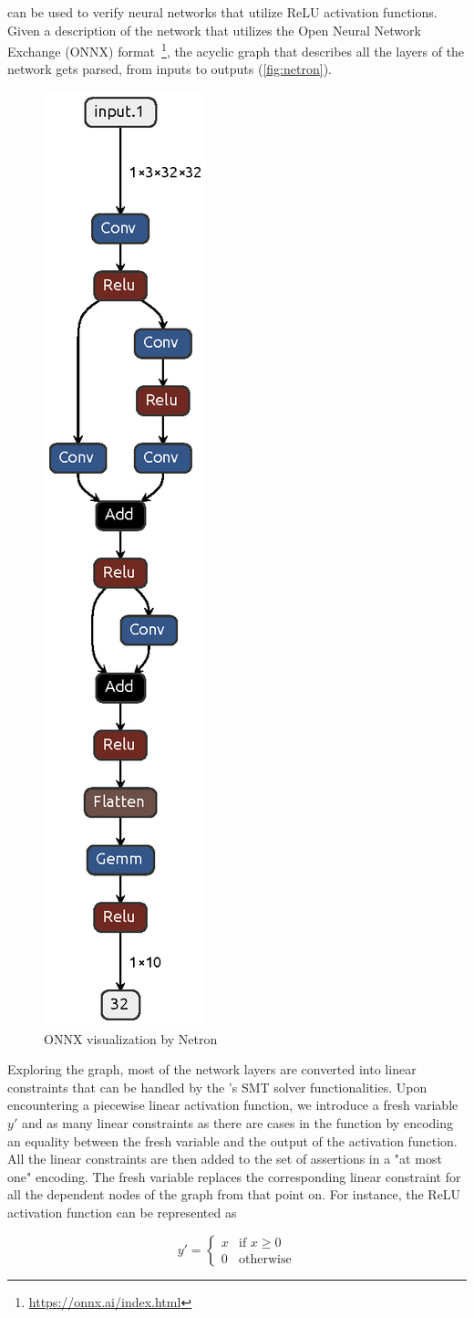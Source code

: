 \documentclass[runningheads]{llncs}
\begin{document}
\dlinear can be used to verify neural networks that utilize ReLU activation functions.
Given a description of the network that utilizes the Open Neural Network Exchange (ONNX) format~\footnote{\url{https://onnx.ai/index.html}}, the acyclic graph that describes all the layers of the network gets parsed, from inputs to outputs (\autoref{fig:netron}).

\begin{figure} %
    \centering
    \begin{adjustbox}{width=.1\textwidth,center}
        \includegraphics[width=.1\textwidth]{img/netron.eps}
    \end{adjustbox}
    \caption{ONNX visualization by Netron}\label{fig:netron}
\end{figure}

Exploring the graph, most of the network layers are converted into linear constraints that can be handled by the \dlinear's SMT solver functionalities.
Upon encountering a piecewise linear activation function, we introduce a fresh variable $y'$ and as many linear constraints as there are cases in the function by encoding an equality between the fresh variable and the output of the activation function.
All the linear constraints are then added to the set of assertions in a "at most one" encoding.
The fresh variable replaces the corresponding linear constraint for all the dependent nodes of the graph from that point on.
For instance, the ReLU activation function can be represented as

$$
    y' = \begin{cases}
        x & \text{if } x \ge 0 \\
        0 & \text{otherwise}
    \end{cases}
$$
\end{document}
